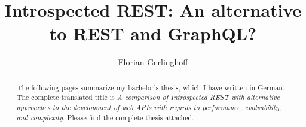 \documentclass[
  a4paper,
  twocolumn,
  twoside=false,
  UKenglish,
  fontsize=12pt,
  headings=normal,
  draft=false,
]{scrartcl}
\title{\LARGE Introspected REST\@: An alternative to REST and GraphQL?} %
\author{Florian Gerlinghoff}
\begin{document}
\maketitle{}

\begin{abstract}
  \noindent{}The following pages summarize my bachelor's thesis, which I have written in German. The complete translated title is \textit{A comparison of Introspected REST with alternative approaches to the development of web APIs with regards to performance, evolvability, and complexity}. Please find the complete thesis attached.
\end{abstract}



\printbibliography{}

\appendix

\end{document}
